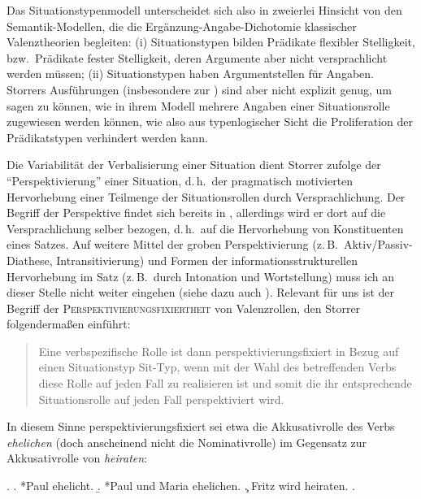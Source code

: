 {Das Situationstypenmodell unterscheidet sich also in zweierlei Hinsicht von den Semantik-Modellen, die die Ergänzung-Angabe-Dichotomie klassischer Valenztheorien begleiten: (i) Situationstypen bilden Prädikate flexibler Stelligkeit, bzw.\ Prädikate fester Stelligkeit, deren Argumente aber nicht versprachlicht werden müssen; (ii) Situationstypen haben Argumentstellen für Angaben. Storrers Ausführungen (insbesondere zur ) sind aber nicht explizit genug, um sagen zu können, wie in ihrem Modell mehrere Angaben einer Situationsrolle zugewiesen werden können, wie also aus typenlogischer Sicht die Proliferation der Prädikatstypen verhindert werden kann.  %

Die Variabilität der Verbalisierung einer Situation dient Storrer zufolge der "`Perspektivierung"' einer Situation, d.\,h.\ der pragmatisch motivierten Hervorhebung einer Teilmenge der Situationsrollen durch Versprachlichung. Der Begriff der Perspektive findet sich bereits in \cite{Fillmore:77,Fillmore:77b}, allerdings wird er dort auf die Versprachlichung selber bezogen, d.\,h.\ auf die Hervorhebung von Konstituenten eines Satzes. Auf weitere Mittel der groben Perspektivierung (z.\,B.\ Aktiv/Passiv-Diathese, Intransitivierung) und Formen der informationsstrukturellen Hervorhebung im Satz (z.\,B.\ durch Intonation und Wortstellung) muss ich an dieser Stelle nicht weiter eingehen (siehe dazu auch \citealt[Kapitel~5]{Duerscheid:99}). Relevant für uns ist der Begriff der \textsc{Perspektivierungsfixiertheit} von Valenzrollen, den Storrer folgenderma\ss en einführt:

\begin{quote}
Eine verbspezifische Rolle ist dann perspektivierungsfixiert in Bezug auf einen Situationstyp Sit-Typ, wenn mit der Wahl des betreffenden Verbs diese Rolle auf jeden Fall zu realisieren ist und somit die ihr entsprechende Situationsrolle auf jeden Fall perspektiviert wird. \citep[285]{Storrer:92}
\end{quote}   
In diesem Sinne perspektivierungsfixiert sei etwa die Akkusativrolle des Verbs {\it ehelichen} (doch anscheinend nicht die Nominativrolle) im Gegensatz zur Akkusativrolle von {\it heiraten}:

\ex. \label{ex-storrer-285}
\a. \label{ex-storrer-285-a} *Paul ehelicht.
\b. \label{ex-storrer-285-b} *Paul und Maria ehelichen.
\c. Fritz wird heiraten.
\z. \citep[285]{Storrer:92}

}
